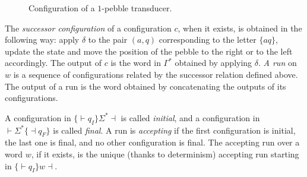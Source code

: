 \documentclass[sigplan,review,anonymous]{acmart}\settopmatter{printfolios=true,printccs=false,printacmref=false}
\theoremstyle{definition}
\theoremstyle{remark}
\begin{document}
\begin{figure}[h!]

\caption{Configuration of a $1$-pebble transducer.}
\label{fig:config2}
\end{figure}

The \emph{successor configuration} of a configuration $c$, when it exists, is obtained in the following way: apply $\delta$ to the pair $(a,q)$ corresponding to the letter $\{aq\}$, update the state and move the position of the pebble to the right or to the left accordingly.
The output of $c$ is the word in $\Gamma^*$ obtained by applying $\delta$.
\emph{A run} on $w$ is a sequence of configurations related by the successor relation defined above. The output of a run is the word obtained by concatenating the outputs of its configurations.

A configuration in $\{{\vdash}q_I\}\Sigma^*{\dashv}$ is called \emph{initial}, and a configuration in ${\vdash}\Sigma^*\{{\dashv}q_F\}$ is called \emph{final}. A run is \emph{accepting} if the first configuration is initial, the last one is final, and no other configuration is final. The accepting run over a word $w$, if it exists, is the unique (thanks to determinism) accepting run starting in $\{{\vdash}q_I\}w{\dashv}$.
\end{document}
